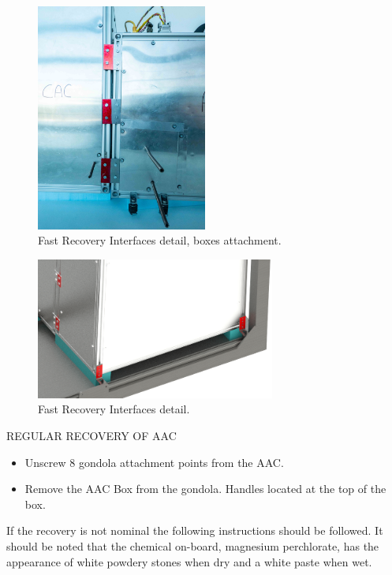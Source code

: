 \begin{figure}[H]
    \centering
    \includegraphics[width=0.5\textwidth]{appendix/img/Recovery_2.jpg}
    \caption{Fast Recovery Interfaces detail, boxes attachment.}
    \label{fig:Interfaces_Detail_II}
\end{figure}

\begin{figure}[H]
    \centering
    \includegraphics[width=0.7\textwidth]{appendix/img/Figure_49_Gondola_c.png}
    \caption{Fast Recovery Interfaces detail.}
    \label{fig:Interfaces_Detail_III}
\end{figure}

REGULAR RECOVERY OF AAC

\begin{itemize}
    \item Unscrew 8 gondola attachment points from the AAC.
    \item Remove the AAC Box from the gondola. Handles located at the top of the box. 
\end{itemize}

If the recovery is not nominal the following instructions should be followed. It should be noted that the chemical on-board, magnesium perchlorate, has the appearance of white powdery stones when dry and a white paste when wet.

